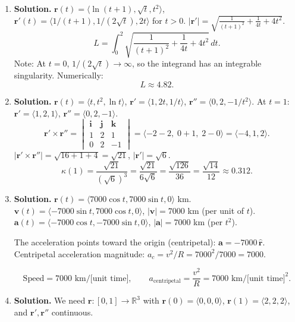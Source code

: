 \begin{enumerate}
$\mathbf{a}(1)=\langle -10\cos 1, -10\sin 1, 2\rangle$.
$|\mathbf{a}(1)|=\sqrt{100+4}=\sqrt{104}=2\sqrt{26}$.

\[
\boxed{|\mathbf{v}(1)|=2\sqrt{26}\approx 10.20,\qquad \mathbf{a}(1)=\langle -10\cos 1, -10\sin 1, 2\rangle,\quad |\mathbf{a}(1)|=2\sqrt{26}.}
\]

\item \textbf{Solution.}
$\mathbf{r}(t)=\langle \ln(t+1), \sqrt{t}, t^2\rangle$, $\mathbf{r}'(t)=\langle 1/(t+1), 1/(2\sqrt{t}), 2t\rangle$ for $t>0$.
$|\mathbf{r}'|=\sqrt{\frac{1}{(t+1)^2}+\frac{1}{4t}+4t^2}$.
\[
L=\int_0^2\sqrt{\frac{1}{(t+1)^2}+\frac{1}{4t}+4t^2}\,dt.
\]
Note: At $t=0$, $1/(2\sqrt{t})\to\infty$, so the integrand has an integrable singularity. Numerically:
\[
\boxed{L\approx 4.82.}
\]

\item \textbf{Solution.}
$\mathbf{r}(t)=\langle t, t^2, \ln t\rangle$, $\mathbf{r}'=\langle 1, 2t, 1/t\rangle$, $\mathbf{r}''=\langle 0, 2, -1/t^2\rangle$.
At $t=1$: $\mathbf{r}'=\langle 1,2,1\rangle$, $\mathbf{r}''=\langle 0,2,-1\rangle$.
\[
\mathbf{r}'\times\mathbf{r}''=\begin{vmatrix}\mathbf{i}&\mathbf{j}&\mathbf{k}\\1&2&1\\0&2&-1\end{vmatrix}=\langle -2-2,\; 0+1,\; 2-0\rangle = \langle -4,1,2\rangle.
\]
$|\mathbf{r}'\times\mathbf{r}''|=\sqrt{16+1+4}=\sqrt{21}$, $|\mathbf{r}'|=\sqrt{6}$.
\[
\boxed{\kappa(1)=\frac{\sqrt{21}}{(\sqrt{6})^3}=\frac{\sqrt{21}}{6\sqrt{6}}=\frac{\sqrt{126}}{36}=\frac{\sqrt{14}}{12}\approx 0.312.}
\]

\item \textbf{Solution.}
$\mathbf{r}(t)=\langle 7000\cos t, 7000\sin t, 0\rangle$ km.
$\mathbf{v}(t)=\langle -7000\sin t, 7000\cos t, 0\rangle$, $|\mathbf{v}|=7000$ km (per unit of $t$).
$\mathbf{a}(t)=\langle -7000\cos t, -7000\sin t, 0\rangle$, $|\mathbf{a}|=7000$ km (per $t^2$).

The acceleration points toward the origin (centripetal): $\mathbf{a}=-7000\,\hat{\mathbf{r}}$.
Centripetal acceleration magnitude: $a_c=v^2/R=7000^2/7000=7000$.

\[
\boxed{\text{Speed}=7000\text{ km/[unit time]},\qquad a_{\text{centripetal}}=\frac{v^2}{R}=7000\text{ km/[unit time]}^2.}
\]

\item \textbf{Solution.}
We need $\mathbf{r}:[0,1]\to\mathbb{R}^3$ with $\mathbf{r}(0)=\langle 0,0,0\rangle$, $\mathbf{r}(1)=\langle 2,2,2\rangle$, and $\mathbf{r}', \mathbf{r}''$ continuous.


\end{enumerate}
